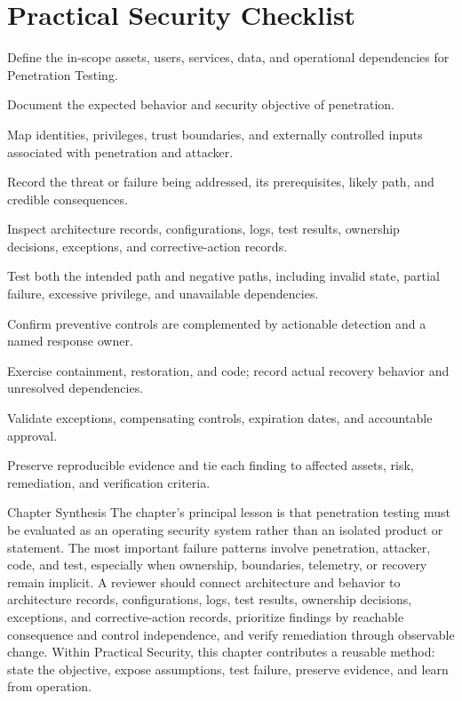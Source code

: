 \documentclass[11pt,letterpaper]{article}
\begin{document}
\section*{Practical Security Checklist}
\begin{CornellChecklist}
\item Define the in-scope assets, users, services, data, and operational dependencies for Penetration Testing.
\item Document the expected behavior and security objective of penetration.
\item Map identities, privileges, trust boundaries, and externally controlled inputs associated with penetration and attacker.
\item Record the threat or failure being addressed, its prerequisites, likely path, and credible consequences.
\item Inspect architecture records, configurations, logs, test results, ownership decisions, exceptions, and corrective-action records.
\item Test both the intended path and negative paths, including invalid state, partial failure, excessive privilege, and unavailable dependencies.
\item Confirm preventive controls are complemented by actionable detection and a named response owner.
\item Exercise containment, restoration, and code; record actual recovery behavior and unresolved dependencies.
\item Validate exceptions, compensating controls, expiration dates, and accountable approval.
\item Preserve reproducible evidence and tie each finding to affected assets, risk, remediation, and verification criteria.
\end{CornellChecklist}
\begin{CornellSummaryBox}{Chapter Synthesis}
The chapter's principal lesson is that penetration testing must be evaluated as an operating security system rather than an isolated product or statement. The most important failure patterns involve penetration, attacker, code, and test, especially when ownership, boundaries, telemetry, or recovery remain implicit. A reviewer should connect architecture and behavior to architecture records, configurations, logs, test results, ownership decisions, exceptions, and corrective-action records, prioritize findings by reachable consequence and control independence, and verify remediation through observable change. Within Practical Security, this chapter contributes a reusable method: state the objective, expose assumptions, test failure, preserve evidence, and learn from operation.
\end{CornellSummaryBox}
\end{document}
